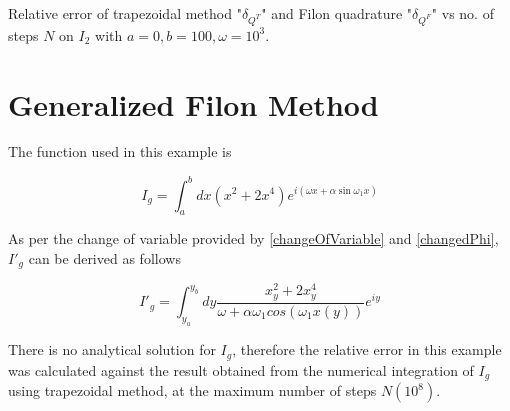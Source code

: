   \begin{table}[h!]
    \begin{center}
      \caption{Relative error of trapezoidal method "$\delta_{Q^T}$" and Filon quadrature "$\delta_{Q^F}$" vs no. of steps $N$ on $I_2$ with $a=0,b=100,\omega=10^3$.}
      \label{table4}
    \end{center}
  \end{table}
  \pagebreak

\section{Generalized Filon Method}

The function used in this example is

\begin{equation}
  I_g=\int_a^b dx(x^2+2x^4)e^{i(\omega x+\alpha \sin{\omega_1x})}
\end{equation}

As per the change of variable provided by \eqref{changeOfVariable} and \eqref{changedPhi}, $I'_g$ can be derived as follows


\begin{equation}
  I'_g=\int_{y_{a}}^{y_{b}} dy \frac{x_y^2+2x_y^4}{\omega+\alpha\omega_1cos(\omega_1x(y))}e^{iy}
\end{equation}

There is no analytical solution for $I_g$, therefore the relative error in this example was calculated against
the result obtained from the numerical integration of $I_g$ using
trapezoidal method, at the maximum number of steps $N(10^8)$.\\

